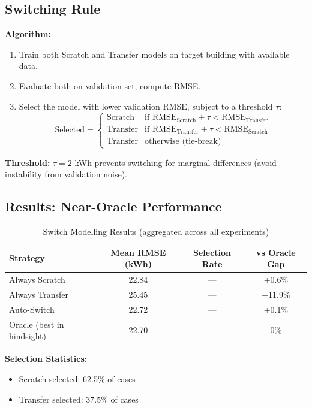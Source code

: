 \documentclass[12pt,a4paper]{report}
\begin{document}
\subsection{Switching Rule}

\textbf{Algorithm:}
\begin{enumerate}
    \item Train both Scratch and Transfer models on target building with available data.
    \item Evaluate both on validation set, compute RMSE.
    \item Select the model with lower validation RMSE, subject to a threshold \(\tau\):
    \[
    \text{Selected} = 
    \begin{cases}
    \text{Scratch} & \text{if } \text{RMSE}_{\text{Scratch}} + \tau < \text{RMSE}_{\text{Transfer}} \\
    \text{Transfer} & \text{if } \text{RMSE}_{\text{Transfer}} + \tau < \text{RMSE}_{\text{Scratch}} \\
    \text{Transfer} & \text{otherwise (tie-break)}
    \end{cases}
    \]
\end{enumerate}

\textbf{Threshold:} \(\tau = 2\) kWh prevents switching for marginal differences (avoid instability from validation noise).

\subsection{Results: Near-Oracle Performance}

\begin{table}[H]
\centering
\caption{Switch Modelling Results (aggregated across all experiments)}
\small
\begin{tabular}{lccc}
\toprule
\textbf{Strategy} & \textbf{Mean RMSE (kWh)} & \textbf{Selection Rate} & \textbf{vs Oracle Gap} \\
\midrule
Always Scratch & 22.84 & --- & +0.6\% \\
Always Transfer & 25.45 & --- & +11.9\% \\
Auto-Switch & 22.72 & --- & +0.1\% \\
Oracle (best in hindsight) & 22.70 & --- & 0\% \\
\bottomrule
\end{tabular}
\end{table}

\textbf{Selection Statistics:}
\begin{itemize}
    \item Scratch selected: 62.5\% of cases
    \item Transfer selected: 37.5\% of cases
\end{itemize}
\end{document}
